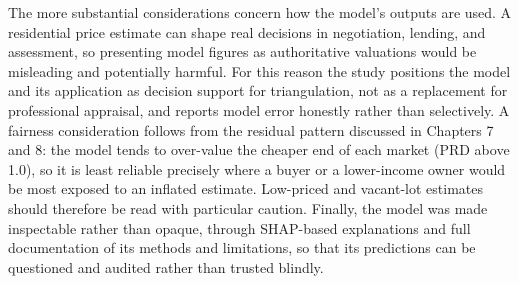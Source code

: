 The more substantial considerations concern how the model's outputs are used. A residential price estimate can shape real decisions in negotiation, lending, and assessment, so presenting model figures as authoritative valuations would be misleading and potentially harmful. For this reason the study positions the model and its application as decision support for triangulation, not as a replacement for professional appraisal, and reports model error honestly rather than selectively. A fairness consideration follows from the residual pattern discussed in Chapters 7 and 8: the model tends to over-value the cheaper end of each market (PRD above 1.0), so it is least reliable precisely where a buyer or a lower-income owner would be most exposed to an inflated estimate. Low-priced and vacant-lot estimates should therefore be read with particular caution. Finally, the model was made inspectable rather than opaque, through SHAP-based explanations and full documentation of its methods and limitations, so that its predictions can be questioned and audited rather than trusted blindly.

